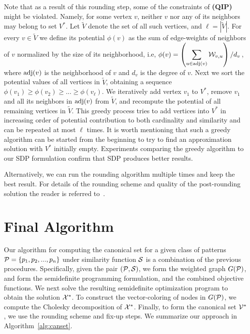 \documentclass{ieee}
\def\P{{\cal P}}
\def\S{{\cal S}}
\def\V{{\cal V}}
\def\W{{\cal W}}
\def\X{{\cal X}}
\begin{document}
Note that as a result of this rounding step, some of the constraints
of \textbf{(QIP)} might be violated. Namely, for some vertex $v$,
neither $v$ nor any of its neighbors may belong to set $V^*$. Let
$\widetilde{V}$ denote the set of all such vertices, and
$\ell=|\widetilde{V}|$. For every $v\in \widetilde{V}$ we define its
potential $\phi(v)$ as the sum of edge-weights of neighbors of $v$
normalized by the size of its neighborhood, i.e,
$\phi(v)={\displaystyle \left (\sum_{u\in {\rm adj}(v)}\W_{v,u}\right
  )\left /d_v\right .}$, where ${\rm adj}(v)$ is the neighborhood of
$v$ and $d_v$ is the degree of $v$.  Next we sort the potential values
of all vertices in $\widetilde{V}$, obtaining a sequence $\phi(v_1)\ge
\phi(v_2)\ge ...\ge \phi(v_\ell)$.  We iteratively add vertex $v_1$ to
$V^*$, remove $v_1$ and all its neighbors in ${\rm adj}(v)$ from
$\widetilde{V}$, and recompute the potential of all remaining vertices
in $\widetilde{V}$.  This greedy process tries to add vertices into
$V^*$ in increasing order of potential contribution to both
cardinality and similarity and can be repeated at most $\ell$ times.
It is worth mentioning that such a greedy algorithm can be started
from the beginning to try to find an approximation solution with $V^*$
initially empty.  Experiments comparing the greedy algorithm to our
SDP formulation confirm that SDP produces better results.

Alternatively, we can run the rounding algorithm multiple times and
keep the best result.  For details of the rounding scheme and quality
of the post-rounding solution the reader is referred
to~\cite{VaziraniApproxAlg2003}.
\vspace{-0.1in}
\section{Final Algorithm}
\label{sec:final}
\vspace{-0.1in}
Our algorithm for computing the canonical set for a given class of
patterns $\P=\{p_1,p_2,...,p_n\}$ under similarity function $\S$ is a
combination of the previous procedures. Specifically, given the pair
$(\P,\S)$, we form the weighted graph $G(\P)$, and form the
semidefinite programming formulation, and the combined objective
functions. We next solve the resulting semidefinite optimization
program to obtain the solution $\X^*$.  To construct the
vector-coloring of nodes in $G(\P)$, we compute the Cholesky
decomposition of $\X^*$. Finally, to form the canonical set $\V^*$, we
use the rounding scheme and fix-up steps.  We summarize our approach
in Algorithm~\ref{alg:canset}.
\end{document}
